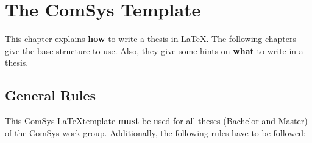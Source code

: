\setcounter{chapter}{-1} %
\chapter{The ComSys Template}
\label{chap:template}

This chapter explains \textbf{how} to write a thesis in \LaTeX.
The following chapters give the base structure to use.
Also, they give some hints on \textbf{what} to write in a thesis.

\section{General Rules}
\label{sec:general_rules}
This \gls{ComSys} \LaTeX template \textbf{must} be used for all theses (Bachelor and Master) of the \gls{ComSys} work group.
Additionally, the following rules have to be followed:
